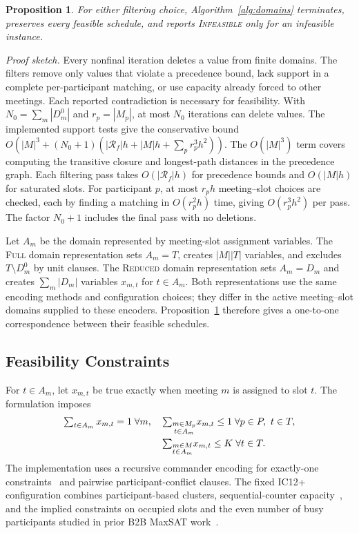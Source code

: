 \documentclass[conference,a4paper]{IEEEtran}
\newcommand{\revised}[1]{#1}
\newtheorem{proposition}{Proposition}
\begin{document}
\begin{proposition}
\label{prop:domain-preservation}
For either filtering choice, Algorithm~\ref{alg:domains} terminates, preserves every feasible schedule, and reports \textup{\textsc{Infeasible}} only for an infeasible instance.
\end{proposition}
\emph{Proof sketch.} Every nonfinal iteration deletes a value from finite domains.  The filters remove only values that violate a precedence bound, lack support in a complete per-participant matching, or use capacity already forced to other meetings. Each reported contradiction is necessary for feasibility.  With $N_0=\sum_m|D_m^0|$ and $r_p=|M_p|$, at most $N_0$ iterations can delete values.  The implemented support tests give the conservative bound $O(|M|^3+(N_0+1)(|\mathcal R_f|h+|M|h+\sum_p r_p^3h^2))$. \revised{The $O(|M|^3)$ term covers computing the transitive closure and longest-path distances in the precedence graph. Each filtering pass takes $O(|\mathcal R_f|h)$ for precedence bounds and $O(|M|h)$ for saturated slots. For participant $p$, at most $r_ph$ meeting--slot choices are checked, each by finding a matching in $O(r_p^2h)$ time, giving $O(r_p^3h^2)$ per pass. The factor $N_0+1$ includes the final pass with no deletions.}

Let $A_m$ be the domain represented by meeting-slot assignment variables.  The \mbox{\textsc{Full}} domain representation sets $A_m=T$, creates $|M||T|$ variables, and excludes $T\setminus D_m^0$ by unit clauses.  The \mbox{\textsc{Reduced}} domain representation sets $A_m=D_m$ and creates $\sum_m|D_m|$ variables $x_{m,t}$ for $t\in A_m$.  Both representations use the same encoding methods and configuration choices; they differ in the active meeting--slot domains supplied to these encoders. Proposition~\ref{prop:domain-preservation} therefore gives a one-to-one correspondence between their feasible schedules.

\subsection{Feasibility Constraints}

For $t\in A_m$, let $x_{m,t}$ be true exactly when meeting $m$ is assigned to slot $t$.  The formulation imposes
\begin{align}
\textstyle\sum_{t\in A_m}x_{m,t}=1\;\forall m, &\quad
\textstyle\sum_{\substack{m\in M_p\\t\in A_m}}\!x_{m,t}\leq1\;\forall p\in P,\ t\in T, \notag\\
&\quad\textstyle\sum_{\substack{m\in M\\t\in A_m}}\!x_{m,t}\leq K\;\forall t\in T.
\label{eq:core-cnf}
\end{align}
The implementation uses a recursive commander encoding for exactly-one constraints~\cite{klieber2007} and pairwise participant-conflict clauses.  The fixed \textsc{IC12+} configuration combines participant-based clusters, sequential-counter capacity~\cite{sinz2005,abio2013}, and the implied constraints on occupied slots and the even number of busy participants studied in prior B2B MaxSAT work~\cite{bofill2019,bofill2022impact}.
\end{document}
